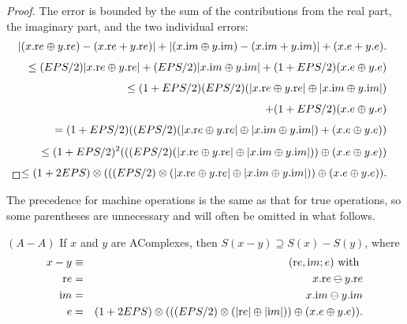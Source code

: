 \begin{proof}{}
The error is bounded by the sum of the contributions from the real part, the imaginary part, and the two individual errors:
\begin{eqnarray*}
 & &\hskip-20pt |(x.{\mathrm re} \oplus y.{\mathrm re}) -(x.{\mathrm re} + y.{\mathrm re})| + |(x.{\mathrm im} \oplus y.{\mathrm im}) -
(x.{\mathrm im} + y.{\mathrm im})| + (x.e + y.e).\\[4pt]
&&\hskip-12pt \le (EPS/2) |x.{\mathrm re} \oplus y.{\mathrm re}| + (EPS/2) |x.{\mathrm im} \oplus y.{\mathrm im}| + 
(1 + EPS/2) (x.e \oplus y.e)\\[4pt]
&&\hskip-12pt \le  (1 + EPS/2) (EPS/2)(|x.{\mathrm re} \oplus y.{\mathrm re}| \oplus 
 |x.{\mathrm im} \oplus y.{\mathrm im}| ) \\[4pt]
&&\hskip-12pt \qquad + (1 + EPS/2) (x.e \oplus y.e)\\[4pt]
&&\hskip-12pt = (1 + EPS/2) ((EPS/2)(|x.{\mathrm re} \oplus y.{\mathrm re}| \oplus 
 |x.{\mathrm im} \oplus y.{\mathrm im}| ) + (x.e \oplus y.e))\\[4pt]
&&\hskip-12pt \le (1 + EPS/2)^2 (((EPS/2) (|x.{\mathrm re} \oplus y.{\mathrm re}| \oplus 
 |x.{\mathrm im} \oplus y.{\mathrm im}| )) \oplus  (x.e \oplus y.e))\\[4pt]
&&\hskip-12pt \le   (1 + 2 EPS) \otimes (((EPS/2)\otimes (|x.{\mathrm re} \oplus
y.{\mathrm re}| \oplus |x.{\mathrm im} \oplus y.{\mathrm im}| )) \oplus (x.e \oplus y.e)).\\[4pt]
\noalign{\vskip-24pt}
\end{eqnarray*}
\end{proof}

The precedence for machine operations is the same as that for true operations, so some  parentheses are unnecessary
and will often be omitted in what
 follows.

\begin{proposition}\label{GMT prop7.7}{$(A - A)$}
If $x$ and $y$ are {\textrm AComplexes,} then 
$S(x - y) \supseteq S(x) - S(y)${\textrm ,} where
\begin{eqnarray*}
x-y &\equiv& ({\mathrm re},{\mathrm im};e) \hbox{ with }\\
{\mathrm re}& =& x.{\mathrm re} \ominus y.{\mathrm re}\\
{\mathrm im}& =& x.{\mathrm im} \ominus y.{\mathrm im}\\
e &=& (1 + 2 EPS) \otimes ( ((EPS/2) \otimes (|{\mathrm re}| \oplus |{\mathrm im}|))
 \oplus (x.e \oplus y.e)).
\end{eqnarray*}
\end{proposition}


